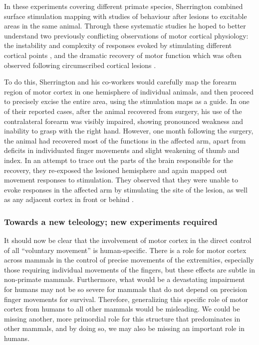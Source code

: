 In these experiments covering different primate species, Sherrington combined surface stimulation mapping with studies of behaviour after lesions to excitable areas in the same animal. Through these systematic studies he hoped to better understand two previously conflicting observations of motor cortical physiology: the instability and complexity of responses evoked by stimulating different cortical points \cite{GrahamBrown1912}, and the dramatic recovery of motor function which was often observed following circumscribed cortical lesions \cite{GrahamBrown1913}.

To do this, Sherrington and his co-workers would carefully map the forearm region of motor cortex in one hemisphere of individual animals, and then proceed to precisely excise the entire area, using the stimulation maps as a guide. In one of their reported cases, after the animal recovered from surgery, his use of the contralateral forearm was visibly impaired, showing pronounced weakness and inability to grasp with the right hand. However, one month following the surgery, the animal had recovered most of the functions in the affected arm, apart from deficits in individuated finger movements and slight weakening of thumb and index. In an attempt to trace out the parts of the brain responsible for the recovery, they re-exposed the lesioned hemisphere and again mapped out movement responses to stimulation. They observed that they were unable to evoke responses in the affected arm by stimulating the site of the lesion, as well as any adjacent cortex in front or behind \cite{Leyton1917}.

\subsubsection*{Towards a new teleology; new experiments required}

It should now be clear that the involvement of motor cortex in the direct control of all ``voluntary movement'' is human-specific. There is a role for motor cortex across mammals in the control of precise movements of the extremities, especially those requiring individual movements of the fingers, but these effects are subtle in non-primate mammals. Furthermore, what would be a devastating impairment for humans may not be so severe for mammals that do not depend on precision finger movements for survival. Therefore, generalizing this specific role of motor cortex from humans to all other mammals would be misleading. We could be missing another, more primordial role for this structure that predominates in other mammals, and by doing so, we may also be missing an important role in humans.

